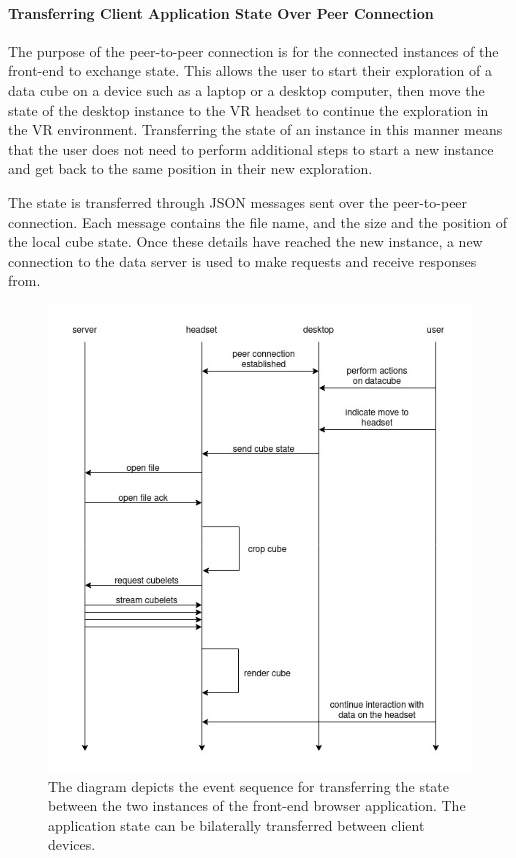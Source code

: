 \paragraph{Transferring Client Application State Over Peer Connection}
The purpose of the peer-to-peer connection is for the connected instances of the front-end to exchange state.
This allows the user to start their exploration of a data cube on a device such as a laptop or a desktop computer, then move the state of the desktop instance to the VR headset to continue the exploration in the VR environment.
Transferring the state of an instance in this manner means that the user does not need to perform additional steps to start a new instance and get back to the same position in their new exploration.

The state is transferred through JSON messages sent over the peer-to-peer connection.
Each message contains the file name, and the size and the position of the local cube state.
Once these details have reached the new instance, a new connection to the data server is used to make requests and receive responses from.

\begin{figure}
    \centering
    \includegraphics[width=0.6\linewidth]{figures/transfer-flow.jpg}
    \caption{The diagram depicts the event sequence for transferring the state between the two instances of the front-end browser application. The application state can be bilaterally transferred between client devices.}
    \label{fig:transfer-flow}
\end{figure}

